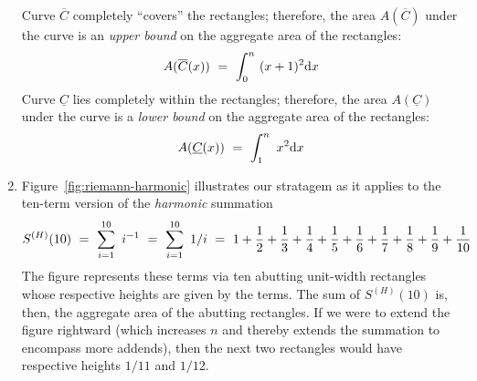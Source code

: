 \begin{enumerate}
\begin{figure}[htb]
\label{fig:riemann-n2}
\end{figure}
Curve $\overline{C}$ completely ``covers'' the rectangles; therefore, the area $A(\overline{C})$ under the curve is an {\em upper bound} on the aggregate area of the rectangles:
\[ A(\overline{C}(x)) \ = \ \int_0^n \ (x+1)^2 {\rm d}x \]
Curve $\underline{C}$ lies completely within the rectangles; therefore, the area $A(\underline{C})$ under the curve is a {\em lower bound} on the aggregate area of the rectangles:
\[ A(\underline{C}(x)) \ = \  \int_1^n  \ x^2 {\rm d}x \]


\medskip\item
Figure~\ref{fig:riemann-harmonic} illustrates our stratagem as it applies to the ten-term version of the {\em harmonic} summation 
\[ S^{(H)}(10) \ = \ \sum_{i=1}^{10} \ i^{-1} \ = \ \sum_{i=1}^{10} \ 1/i 
  \ = \
1 +  {1 \over 2} + {1 \over 3}  + {1 \over 4}  + {1 \over 5} + {1 \over 6} + {1 \over 7} + {1 \over 8}  + {1 \over 9}  + {1 \over 10} 
\]
The figure represents these terms via ten abutting unit-width rectangles whose respective heights are given by the terms.  The sum of $S^{(H)}(10)$ is, then, the aggregate area of the abutting rectangles.  If we were to extend the figure rightward (which increases $n$ and thereby extends the summation to encompass more addends), then the next two rectangles would have respective heights $1/11$ and $1/12$.

\smallskip


\end{enumerate}
